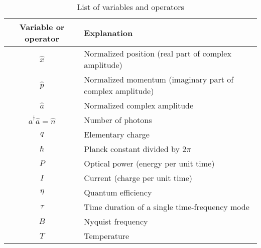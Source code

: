 \begin{table}
\caption{List of variables and operators}	
\begin{center}
\begin{tabular}{c l}
\hline
	Variable or operator & Explanation \\
	\hline \hline
	$\hat x$ & Normalized position (real part of complex amplitude)\\
	$\hat p$ & Normalized momentum (imaginary part of complex amplitude)\\
	$\hat a$ & Normalized complex amplitude\\
	$\hat a ^\dagger \hat a = \hat n$ & Number of photons\\
	$q$ & Elementary charge\\
	$\hbar$ & Planck constant divided by $2\pi$\\
	$P$ & Optical power (energy per unit time)\\
	$I$ & Current (charge per unit time)\\
	$\eta$ & Quantum efficiency\\
	$\tau$ & Time duration of a single time-frequency mode\\
	$B$ & Nyquist frequency\\
	$T$ & Temperature\\
\hline
\end{tabular}
\label{table:variables}
\end{center}
\end{table}

